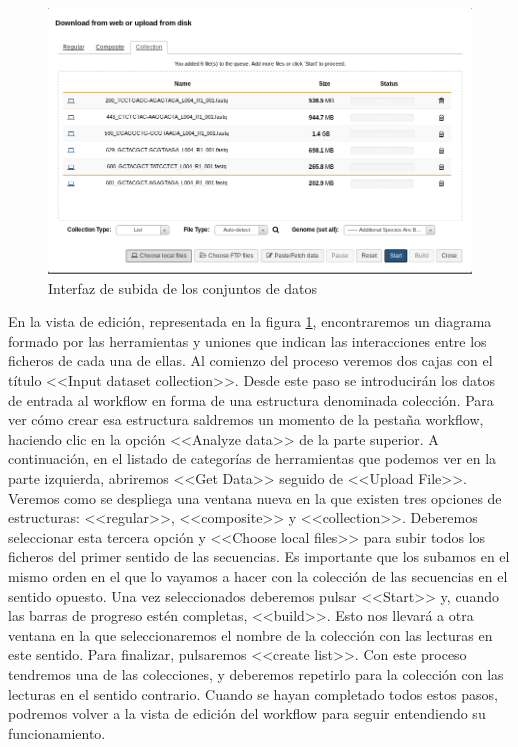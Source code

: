 \begin{figure}[!ht]
    \begin{center}
      \includegraphics[scale=0.55]{images/SubidaDatasets.png}
      \caption{Interfaz de subida de los conjuntos de datos}
      \label{fig:SubidaDatasets}
    \end{center}
\end{figure}

En la vista de edición, representada en la figura \ref{fig:SubidaDatasets}, encontraremos un diagrama formado por las herramientas y uniones que indican las interacciones entre los ficheros de cada una de ellas. Al comienzo del proceso veremos dos cajas con el título <<Input dataset collection>>. Desde este paso se introducirán los datos de entrada al workflow en forma de una estructura denominada colección. Para ver cómo crear esa estructura saldremos un momento de la pestaña workflow, haciendo clic en la opción <<Analyze data>> de la parte superior. A continuación, en el listado de categorías de herramientas que podemos ver en la parte izquierda, abriremos <<Get Data>> seguido de <<Upload File>>. Veremos como se despliega una ventana nueva en la que existen tres opciones de estructuras: <<regular>>, <<composite>> y <<collection>>. Deberemos seleccionar esta tercera opción y <<Choose local files>> para subir todos los ficheros del primer sentido de las secuencias. Es importante que los subamos en el mismo orden en el que lo vayamos a hacer con la colección de las secuencias en el sentido opuesto. Una vez seleccionados deberemos pulsar <<Start>> y, cuando las barras de progreso estén completas, <<build>>. Esto nos llevará a otra ventana en la que seleccionaremos el nombre de la colección con las lecturas en este sentido. Para finalizar, pulsaremos <<create list>>. Con este proceso tendremos una de las colecciones, y deberemos repetirlo para la colección con las lecturas en el sentido contrario. Cuando se hayan completado todos estos pasos, podremos volver a la vista de edición del workflow para seguir entendiendo su funcionamiento.


